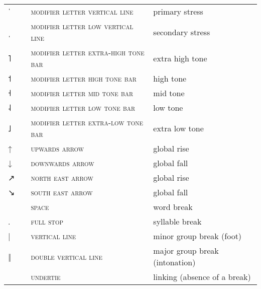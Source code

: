 \label{tab:ipa_leftovers}
 \tablelasttail{\bottomrule}

\begin{center}
\Needspace{6cm}
\begin{xtabular}{ l L{1.2cm} L{5.4cm} L{4cm} }
{\large ˈ} &  & \textsc{modifier letter vertical line} & primary stress \\
{\large ˌ} &  & \textsc{modifier letter low vertical line} & secondary stress \\
{˥} &  & \textsc{modifier letter extra-high tone bar} & extra high tone \\
{˦} &  & \textsc{modifier letter high tone bar} & high tone \\
{˧} &  & \textsc{modifier letter mid tone bar} & mid tone \\
{˨} &  & \textsc{modifier letter low tone bar} & low tone \\
{˩} &  & \textsc{modifier letter extra-low tone bar} & extra low tone \\
{↑} &  & \textsc{upwards arrow} & global rise \\
{↓} &  & \textsc{downwards arrow} & global fall \\
{↗} &  & \textsc{north east arrow} & global rise \\
{↘} &  & \textsc{south east arrow} & global fall \\
 &  & \textsc{space} & word break \\
{\large.} &  & \textsc{full stop} & syllable break \\
{|} &  & \textsc{vertical line} & minor group break (foot) \\
{‖} &  & \textsc{double vertical line} & major group break (intonation) \\
 &  & \textsc{undertie} & linking (absence of a break) \\
\end{xtabular}
\end{center}